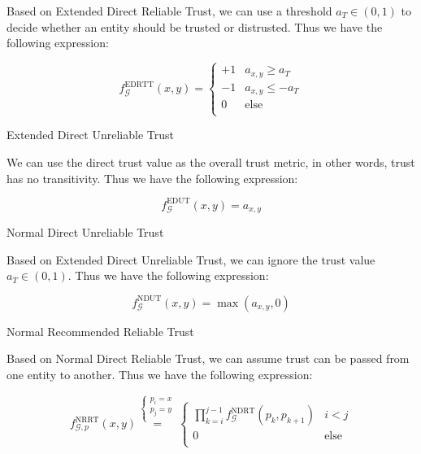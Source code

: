 \documentclass{article}
\begin{document}
Based on Extended Direct Reliable Trust, we can use a threshold \(a_T\in (0,1)\) to decide whether an entity should be trusted or distrusted. Thus
we have the following expression:

\begin{equation}
f_{\mathcal{G}}^{\text{EDRTT}}(x,y)=\left\{
\begin{array}{cc}
 +1 & a_{x,y}\geq a_T \\
 -1 & a_{x,y}\leq -a_T \\
 0 & \text{else} \\
\end{array}
\right.
\end{equation}

Extended Direct Unreliable Trust

We can use the direct trust value as the overall trust metric, in other words, trust has no transitivity. Thus we have the following expression:

\begin{equation}
f_{\mathcal{G}}^{\text{EDUT}}(x,y)=a_{x,y}
\end{equation}

Normal Direct Unreliable Trust

Based on Extended Direct Unreliable Trust, we can ignore the trust value \(a_T\in (0,1)\). Thus we have the following expression:

\begin{equation}
f_{\mathcal{G}}^{\text{NDUT}}(x,y)=\max \left(a_{x,y},0\right)
\end{equation}

Normal Recommended Reliable Trust

Based on Normal Direct Reliable Trust, we can assume trust can be passed from one entity to another. Thus we have the following expression:

\begin{equation}
f_{\mathcal{G},\mathit{p}}^{\text{NRRT}}(x,y)\overset{\left\{
\begin{array}{c}
 \mathit{p}_i=x \\
 \mathit{p}_j=y \\
\end{array}
\right.}{=}\left\{
\begin{array}{cc}
 \prod _{k=i}^{j-1} f_{\mathcal{G}}^{\text{NDRT}}\left(\mathit{p}_k,p_{k+1}\right) & i<j \\
 0 & \text{else} \\
\end{array}
\right.
\end{equation}
\end{document}

